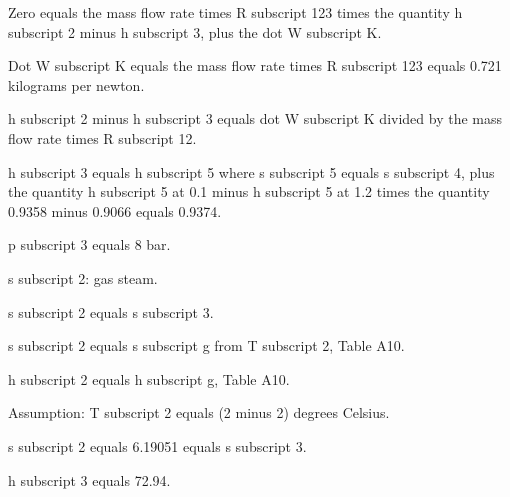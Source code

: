 Zero equals the mass flow rate times R subscript 123 times the quantity h subscript 2 minus h subscript 3, plus the dot W subscript K.

Dot W subscript K equals the mass flow rate times R subscript 123 equals 0.721 kilograms per newton.

h subscript 2 minus h subscript 3 equals dot W subscript K divided by the mass flow rate times R subscript 12.

h subscript 3 equals h subscript 5 where s subscript 5 equals s subscript 4, plus the quantity h subscript 5 at 0.1 minus h subscript 5 at 1.2 times the quantity 0.9358 minus 0.9066 equals 0.9374.

p subscript 3 equals 8 bar.

s subscript 2: gas steam.

s subscript 2 equals s subscript 3.

s subscript 2 equals s subscript g from T subscript 2, Table A10.

h subscript 2 equals h subscript g, Table A10.

Assumption: T subscript 2 equals (2 minus 2) degrees Celsius.

s subscript 2 equals 6.19051 equals s subscript 3.

h subscript 3 equals 72.94.